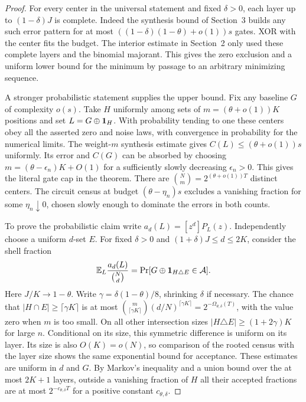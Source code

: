 \begin{proof}
For every center in the universal statement and fixed $\delta>0$, each layer up to $(1-\delta)J$ is complete. Indeed the synthesis bound of Section~3 builds any such error pattern for at most $((1-\delta)(1-\theta)+o(1))s$ gates. XOR with the center fits the budget. The interior estimate in Section~2 only used these complete layers and the binomial majorant. This gives the zero exclusion and a uniform lower bound for the minimum by passage to an arbitrary minimizing sequence.


A stronger probabilistic statement supplies the upper bound. Fix any baseline $G$ of complexity $o(s)$. Take $H$ uniformly among sets of $m=(\theta+o(1))K$ positions and set $L=G\oplus {\bf1}_H$. With probability tending to one these centers obey all the asserted zero and noise laws, with convergence in probability for the numerical limits. The weight-$m$ synthesis estimate gives $C(L)\le(\theta+o(1))s$ uniformly. Its error and $C(G)$ can be absorbed by choosing $m=(\theta-\epsilon_n)K+O(1)$ for a sufficiently slowly decreasing $\epsilon_n>0$. This gives the literal gate cap in the theorem. There are $\binom Nm=2^{(\theta+o(1))T}$ distinct centers. The circuit census at budget $(\theta-\eta_n)s$ excludes a vanishing fraction for some $\eta_n\downarrow0$, chosen slowly enough to dominate the errors in both counts.

To prove the probabilistic claim write $a_d(L)=[z^d]P_L(z)$. Independently choose a uniform $d$-set $E$. For fixed $\delta>0$ and $(1+\delta)J\le d\le 2K$, consider the shell fraction
\[
 \mathbb E_L\frac{a_d(L)}{\binom Nd}
      =\Pr[G\oplus{\bf1}_{H\triangle E}\in\mathcal A].
\]
Here $J/K\to1-\theta$. Write $\gamma=\delta(1-\theta)/8$, shrinking $\delta$ if necessary. The chance that $|H\cap E|\ge\lceil\gamma K\rceil$ is at most $\binom{m}{\lceil\gamma K\rceil}(d/N)^{\lceil\gamma K\rceil}=2^{-\Omega_{\theta,\delta}(T)}$, with the value zero when $m$ is too small. On all other intersection sizes $|H\triangle E|\ge(1+2\gamma)K$ for large $n$. Conditional on its size, this symmetric difference is uniform on its layer. Its size is also $O(K)=o(N)$, so comparison of the rooted census with the layer size shows the same exponential bound for acceptance. These estimates are uniform in $d$ and $G$. By Markov's inequality and a union bound over the at most $2K+1$ layers, outside a vanishing fraction of $H$ all their accepted fractions are at most $2^{-c_{\theta,\delta}T}$ for a positive constant $c_{\theta,\delta}$.


\end{proof}
